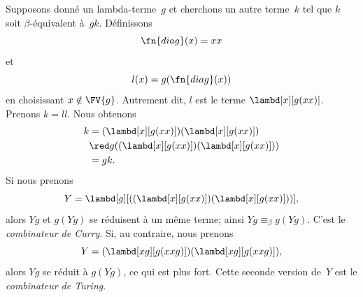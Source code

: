 \documentclass[../../../include/open-logic-section]{subfiles}
\begin{document}

Supposons donné un lambda-terme~$g$ et cherchons
un autre terme~$k$ tel que $k$ soit
$\beta$-équivalent à~$gk$. Définissons
\[
\fn{diag}(x)=xx
\]
et
\[
l(x)=g(\fn{diag}(x))
\]
en choisissant $x\notin\FV{g}$. Autrement dit,
$l$ est le terme $\lambd[x][g(xx)]$. Prenons
$k=ll$. Nous obtenons
\begin{align*}
k & = (\lambd[x][g(xx)])(\lambd[x][g(xx)]) \\
& \red g((\lambd[x][g(xx)])(\lambd[x][g(xx)])) \\
& = gk.
\end{align*}
Si nous prenons
\[
Y=\lambd[g][((\lambd[x][g(xx)])(\lambd[x][g(xx)]))],
\]
alors $Yg$ et $g(Yg)$ se réduisent à un même
terme; ainsi $Yg\equiv_\beta g(Yg)$. C'est
le \emph{combinateur de Curry}. Si, au contraire,
nous prenons
\[
Y=(\lambd[xg][g(xxg)])(\lambd[xg][g(xxg)]),
\]
alors $Yg$ se réduit à $g(Yg)$, ce qui est
plus fort. Cette seconde version de~$Y$
est le \emph{combinateur de Turing}.
\end{document}
